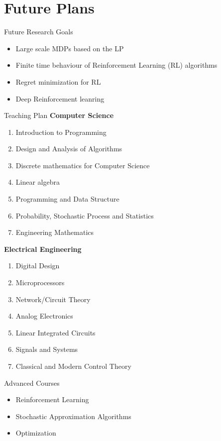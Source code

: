 \documentclass[10pt,handout]{beamer}
\begin{document}
\section{Future Plans}
\begin{frame}[fragile]{Future Research Goals}
\begin{itemize}
\item Large scale MDPs based on the LP
\item Finite time behaviour of Reinforcement Learning (RL) algorithms
\item Regret minimization for RL
\item Deep Reinforcement leanring
\end{itemize}
\end{frame}
\begin{frame}[fragile]{Teaching Plan}
\textbf{Computer Science}
\begin{enumerate}
\item Introduction to Programming
\item Design and Analysis of Algorithms
\item Discrete mathematics for Computer Science
\item Linear algebra
\item Programming and Data Structure
\item Probability, Stochastic Process and Statistics
\item Engineering Mathematics
\end{enumerate}
\textbf{Electrical Engineering}
\begin{enumerate}
\item Digital Design
\item Microprocessors
\item Network/Circuit Theory
\item Analog Electronics
\item Linear Integrated Circuits
\item Signals and Systems
\item Classical and Modern Control Theory
\end{enumerate}
\end{frame}
\begin{frame}[fragile]{Advanced Courses}
\begin{itemize}
\item Reinforcement Learning
\item Stochastic Approximation Algorithms
\item Optimization
\end{itemize}
\end{frame}
\end{document}
